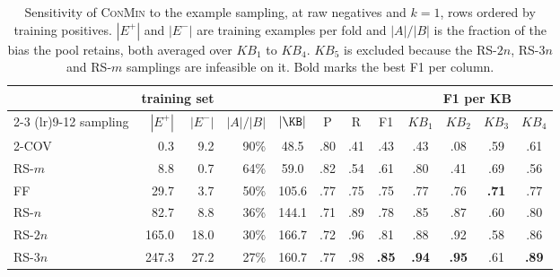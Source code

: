 \begin{table}[t]
\centering
\small
\setlength{\tabcolsep}{5pt}
\begin{tabular}{lrrrcccccccc}
\toprule
 & \multicolumn{2}{c}{training set} &  &  &  &  &  & \multicolumn{4}{c}{F1 per KB} \tabularnewline
\cmidrule(lr){2-3} \cmidrule(lr){9-12}
sampling & $|E^+|$ & $|E^-|$ & $|A|/|B|$ & $|\KB|$ & P & R & F1 & $KB_{1}$ & $KB_{2}$ & $KB_{3}$ & $KB_{4}$ \tabularnewline
\midrule
2-COV & 0.3 & 9.2 & 90\% & 48.5 & .80 & .41 & .43 & .43 & .08 & .59 & .61 \tabularnewline
RS-$m$ & 8.8 & 0.7 & 64\% & 59.0 & .82 & .54 & .61 & .80 & .41 & .69 & .56 \tabularnewline
FF & 29.7 & 3.7 & 50\% & 105.6 & .77 & .75 & .75 & .77 & .76 & \textbf{.71} & .77 \tabularnewline
RS-$n$ & 82.7 & 8.8 & 36\% & 144.1 & .71 & .89 & .78 & .85 & .87 & .60 & .80 \tabularnewline
RS-$2n$ & 165.0 & 18.0 & 30\% & 166.7 & .72 & .96 & .81 & .88 & .92 & .58 & .86 \tabularnewline
RS-$3n$ & 247.3 & 27.2 & 27\% & 160.7 & .77 & .98 & \textbf{.85} & \textbf{.94} & \textbf{.95} & .61 & \textbf{.89} \tabularnewline
\bottomrule
\end{tabular}
\caption{Sensitivity of \textsc{ConMin} to the example sampling, at raw negatives and $k=1$, rows ordered by training positives. $|E^+|$ and $|E^-|$ are training examples per fold and $|A|/|B|$ is the fraction of the bias the pool retains, both averaged over $KB_{1}$ to $KB_{4}$. $KB_{5}$ is excluded because the RS-$2n$, RS-$3n$ and RS-$m$ samplings are infeasible on it. Bold marks the best F1 per column.}
\label{tab:app-sampling}
\end{table}
